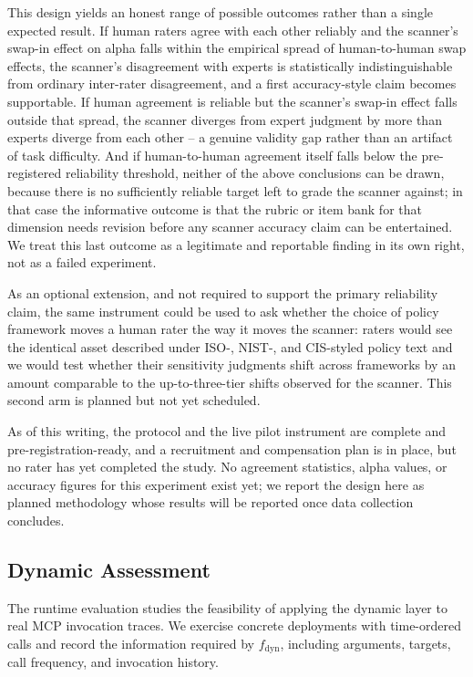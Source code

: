 \documentclass[sigconf]{acmart}
\begin{document}
This design yields an honest range of possible outcomes rather than a single expected result. If human raters agree with each other reliably and the scanner's swap-in effect on alpha falls within the empirical spread of human-to-human swap effects, the scanner's disagreement with experts is statistically indistinguishable from ordinary inter-rater disagreement, and a first accuracy-style claim becomes supportable. If human agreement is reliable but the scanner's swap-in effect falls outside that spread, the scanner diverges from expert judgment by more than experts diverge from each other -- a genuine validity gap rather than an artifact of task difficulty. And if human-to-human agreement itself falls below the pre-registered reliability threshold, neither of the above conclusions can be drawn, because there is no sufficiently reliable target left to grade the scanner against; in that case the informative outcome is that the rubric or item bank for that dimension needs revision before any scanner accuracy claim can be entertained. We treat this last outcome as a legitimate and reportable finding in its own right, not as a failed experiment.

As an optional extension, and not required to support the primary reliability claim, the same instrument could be used to ask whether the choice of policy framework moves a human rater the way it moves the scanner: raters would see the identical asset described under ISO-, NIST-, and CIS-styled policy text and we would test whether their sensitivity judgments shift across frameworks by an amount comparable to the up-to-three-tier shifts observed for the scanner. This second arm is planned but not yet scheduled.

As of this writing, the protocol and the live pilot instrument are complete and pre-registration-ready, and a recruitment and compensation plan is in place, but no rater has yet completed the study. No agreement statistics, alpha values, or accuracy figures for this experiment exist yet; we report the design here as planned methodology whose results will be reported once data collection concludes.


\subsection{Dynamic Assessment}
\label{sec:dynamic-eval}

The runtime evaluation studies the feasibility of applying the dynamic layer
to real MCP invocation traces. We exercise concrete deployments with
time-ordered calls and record the information required by
$f_{\mathrm{dyn}}$, including arguments, targets, call frequency, and
invocation history.
\end{document}
